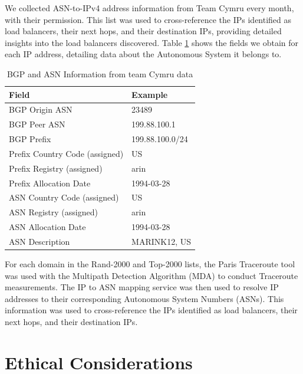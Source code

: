 \documentclass[12pt]{cwru_thesis}
\begin{document}
 
 We collected ASN-to-IPv4 address information from Team Cymru every month, with their permission. This list was used to cross-reference the IPs identified as load balancers, their next hops, and their destination IPs, providing detailed insights into the load balancers discovered. Table \ref{tab:bgp_asn_info} shows the fields we obtain for each IP address, detailing data about  the Autonomous System it belongs to. 

\begin{table}[h]
    \centering
    \begin{tabular}{|l|l|}
        \hline
        \textbf{Field} & \textbf{Example} \\
        \hline
        BGP Origin ASN & 23489 \\
        \hline
        BGP Peer ASN & 199.88.100.1 \\
        \hline
        BGP Prefix & 199.88.100.0/24 \\
        \hline
        Prefix Country Code (assigned) & US \\
        \hline
        Prefix Registry (assigned) & arin \\
        \hline
        Prefix Allocation Date & 1994-03-28 \\
        \hline
        ASN Country Code (assigned) & US \\
        \hline
        ASN Registry (assigned) & arin \\
        \hline
        ASN Allocation Date & 1994-03-28 \\
        \hline
        ASN Description & MARINK12, US \\
        \hline
    \end{tabular}
    \caption{BGP and ASN Information from team Cymru data}
    \label{tab:bgp_asn_info}
\end{table}




For each domain in the Rand-2000 and Top-2000 lists, the Paris Traceroute tool was used with the Multipath Detection Algorithm (MDA) to conduct Traceroute measurements. The IP to ASN mapping service was then used to resolve IP addresses to their corresponding Autonomous System Numbers (ASNs). This information was used to cross-reference the IPs identified as load balancers, their next hops, and their destination IPs.

\section{Ethical Considerations}
\end{document}
